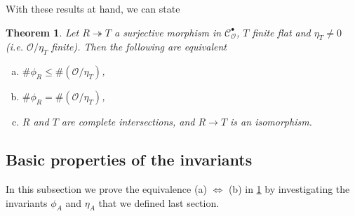 \documentclass{article}
\theoremstyle{plain}%
\newtheorem{theorem}{Theorem}[section]
\theoremstyle{definition}
\theoremstyle{remark}
\newcommand{\cob}{\mathcal{C}_\mathcal{O}^\bullet}
\begin{document}
With these results at hand, we can state 
\begin{theorem}\textup{\cite[theorem 5.3]{Darmon1995}}\label{thm:wiles_numerical_criterion}
    Let \(R \twoheadrightarrow T\) a surjective morphism in \(\cob\), \(T\) finite flat and \(\eta_T \neq 0\) 
    (i.e. \(\mathcal{O}/\eta_T\) finite).
    Then the following are equivalent
    \begin{enumerate}[(a)]
        \item \(\# \phi_R \le \#(\mathcal{O}/\eta_T)\),
        \item \(\# \phi_R = \#(\mathcal{O}/\eta_T)\),
        \item \(R\) and \(T\) are complete intersections, and \(R \to T\) is an isomorphism.
    \end{enumerate}
\end{theorem}

\subsection{Basic properties of the invariants}
In this subsection we prove the equivalence (a) \(\Leftrightarrow\) (b) in \cref{thm:wiles_numerical_criterion}
by investigating the invariants \(\phi_A\) and \(\eta_A\) that we defined last section.
\end{document}
